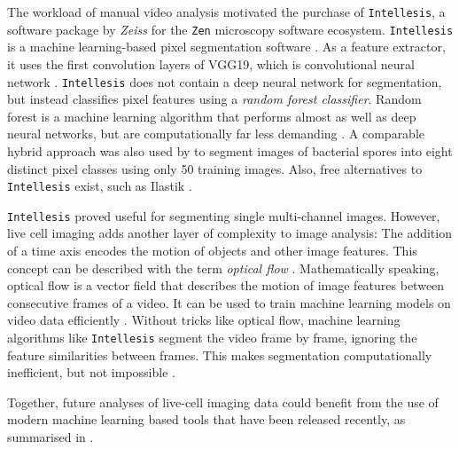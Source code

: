 The workload of manual video analysis motivated the purchase of
\texttt{Intellesis}, a software package by \textit{Zeiss} for the \texttt{Zen}
microscopy software ecosystem. \texttt{Intellesis} is a machine learning-based
pixel segmentation software \cite{ZeissOADFeature}. As a feature
extractor\footterm{\footimagefeatures}{\label{foot:image_features}}, it uses the first
convolution layers of VGG19, which is convolutional neural
network\footterm{\footcnn}{\label{foot:cnn}} \cite{simonyanVeryDeepConvolutional2015}.
\texttt{Intellesis} does not contain a deep neural network for segmentation, but
instead classifies pixel features using a \emph{random forest classifier}.
Random forest is a machine learning algorithm that  performs almost as well as deep neural networks, but
are computationally far less demanding \cite{breimanRandomForests2001,
    richardsonDenseNeuralNetwork2023}. A comparable hybrid approach was also used by
\citet{qamarHybridCNNRandomForest2023} to segment images of bacterial spores
into eight distinct pixel classes using only 50 training images. Also, free
alternatives to \texttt{Intellesis} exist, such as Ilastik
\cite{bergIlastikInteractiveMachine2019}.

\texttt{Intellesis} proved useful for segmenting single multi-channel images.
However, live cell imaging adds another layer of complexity to image analysis:
The addition of a time axis encodes the motion of objects and other image
features. This concept can be described with the term \emph{optical flow}
\cite{niehorsterOpticFlowHistory2021}. Mathematically speaking, optical flow is
a vector field that describes the motion of image
features between consecutive frames of a video. It
can be used to train machine learning models on video data efficiently
\cite{robitailleSelfsupervisedMachineLearning2022}. Without tricks like optical
flow, machine learning algorithms like \texttt{Intellesis} segment the video
frame by frame, ignoring the feature similarities between frames. This makes
segmentation computationally inefficient, but not impossible
\cite{pylvanainenLivecellImagingDeep2023}.

Together, future analyses of live-cell imaging data could  benefit
from the use of modern machine learning based tools that have been released
recently, as summarised in \citet{pylvanainenLivecellImagingDeep2023}.



